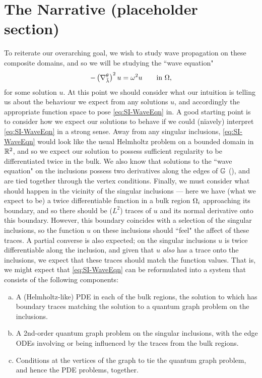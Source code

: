 \section{The Narrative (placeholder section)}

To reiterate our overarching goal, we wish to study wave propagation on these composite domains, and so we will be studying the ``wave equation"
\begin{align} \label{eq:SI-WaveEqn}
	-\left( \nabla^{\theta}_{\tilde{\lambda}} \right)^2 u = \omega^2 u \qquad\text{in } \Omega,
\end{align}
for some solution $u$.
At this point we should consider what our intuition is telling us about the behaviour we expect from any solutions $u$, and accordingly the appropriate function space to pose \eqref{eq:SI-WaveEqn} in.
A good starting point is to consider how we expect our solutions to behave if we could (n\"{i}avely) interpret \eqref{eq:SI-WaveEqn} in a strong sense.
Away from any singular inclusions, \eqref{eq:SI-WaveEqn} would look like the usual Helmholtz problem on a bounded domain in $\mathbb{R}^2$, and so we expect our solution to possess sufficient regularity to be differentiated twice in the bulk.
We also know that solutions to the ``wave equation" on the inclusions possess two derivatives along the edges of $\mathbb{G}$ (), and are tied together through the vertex conditions.
Finally, we must consider what should happen in the vicinity of the singular inclusions --- here we have (what we expect to be) a twice differentiable function in a bulk region $\Omega_i$ approaching its boundary, and so there should be ($L^2$) traces of $u$ and its normal derivative onto this boundary.
However, this boundary coincides with a selection of the singular inclusions, so the function $u$ on these inclusions should ``feel" the affect of these traces.
A partial converse is also expected; on the singular inclusions $u$ is twice differentiable along the inclusion, and given that $u$ \emph{also} has a trace onto the inclusions, we expect that these traces should match the function values.
That is, we might expect that \eqref{eq:SI-WaveEqn} can be reformulated into a system that consists of the following components:
\begin{enumerate}[(a)]
	\item A (Helmholtz-like) PDE in each of the bulk regions, the solution to which has boundary traces matching the solution to a quantum graph problem on the inclusions.
	\item A 2nd-order quantum graph problem on the singular inclusions, with the edge ODEs involving or being influenced by the traces from the bulk regions.
	\item Conditions at the vertices of the graph to tie the quantum graph problem, and hence the PDE problems, together.
\end{enumerate}

